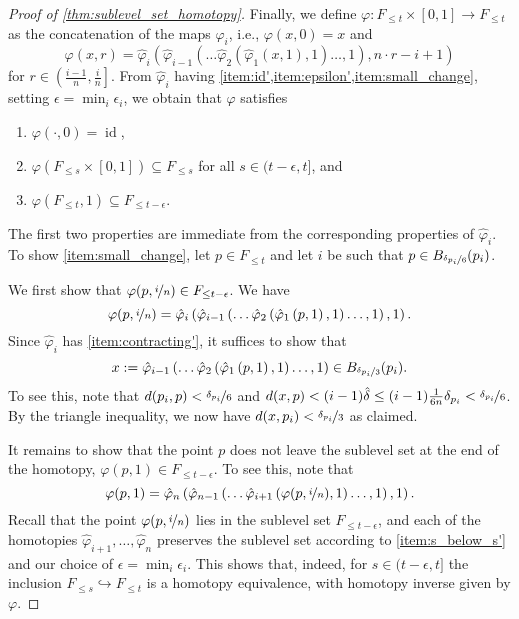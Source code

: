 \begin{proof}[Proof of \cref{thm:sublevel_set_homotopy}]

	Finally, we define $\varphi \colon F_{\leq t} \times [0,1] \to F_{\leq t}$ as the concatenation of the maps $\hat{\varphi}_{i}$, i.e., $\varphi(x,0) = x$ and
	\[\varphi(x,r) = \hat{\varphi}_{i} \left( \hat{\varphi}_{i-1} \left( \dots \hat{\varphi}_{2} \left( \hat{\varphi}_{1} \left( x, 1 \right), 1 \right) \dots, 1 \right), n \cdot r - i + 1\right)\] for $r \in \left( \frac{i-1}{n}, \frac{i}{n} \right]$.
	From $\hat{\varphi}_{i}$ having \cref{item:id',item:epsilon',item:small_change}, setting $\epsilon = \min_{i} \epsilon_{i}$, we obtain that $\varphi$ satisfies
	\begin{enumerate}[label={(\arabic*'')}]
		\item $\varphi(\cdot, 0) = \operatorname{id}$,
		\item $\varphi(F_{\leq s} \times [0,1]) \subseteq F_{\leq s}$ for all $s \in (t - \epsilon, t]$, and
		\item $\varphi(F_{\leq t}, 1) \subseteq F_{\leq t - \epsilon}$.
	\end{enumerate}
	The first two properties are immediate from the corresponding properties of $\hat{\varphi}_{i}$.
	To show \cref{item:small_change},
	let $p \in F_{\leq t}$ and let $i$ be such that
	$p \in B_{\nicefrac{\delta_{p_{i}}}{6}}(p_{i})$.

	We first show that $\varphi(p, \nicefrac i n) \in F_{\leq t - \epsilon}$.
	We have
	\[
	\varphi(p, \nicefrac i n) = \hat{\varphi}_{i} \left( \hat{\varphi}_{i-1} \left( \dots \hat{\varphi}_{2} \left( \hat{\varphi}_{1} \left( p, 1 \right), 1 \right) \dots, 1 \right), 1\right).\]
	Since $\hat{\varphi}_{i}$ has \cref{item:contracting'}, it suffices to show that \[x:=\hat{\varphi}_{i-1} \left( \dots \hat{\varphi}_{2} \left( \hat{\varphi}_{1} \left( p, 1 \right), 1 \right) \dots, 1 \right) \in B_{\nicefrac{\delta_{p_{i}}}{3}}(p_{i}).\]
	To see this, note that $d(p_i, p) < \nicefrac{\delta_{p_{i}}}{6}$ and $d(x,p) < (i-1)\hat{\delta} \leq (i-1) \frac 1 {6n} \delta_{p_{i}} < \nicefrac{\delta_{p_{i}}}{6}$.
	By the triangle inequality, we now have $d(x, p_i) < \nicefrac{\delta_{p_{i}}}{3}$ as claimed.

	It remains to show that the point $p$ does not leave the sublevel set at the end of the homotopy, $\varphi(p, 1) \in F_{\leq t - \epsilon}$.
	To see this, note that
		\[
	\varphi(p, 1) =
	\hat{\varphi}_{n} \left( \hat{\varphi}_{n-1} \left( \dots
	\hat{\varphi}_{i+1} \left(
	\varphi(p, \nicefrac i n) , 1 \right)\dots, 1\right), 1 \right).\]
	Recall that the point $\varphi(p, \nicefrac i n)$ lies in the sublevel set $F_{\leq t - \epsilon}$, and each of the homotopies $\hat{\varphi}_{i+1}, \dots, \hat{\varphi}_n$ preserves the sublevel set according to \cref{item:s_below_s'} and our choice of $\epsilon = \min_{i} \epsilon_{i}$.
	This shows that, indeed, for $s \in (t - \epsilon, t]$ the inclusion $F_{\leq s} \hookrightarrow F_{\leq t}$ is a homotopy equivalence, with homotopy inverse given by $\varphi$.
\end{proof}
